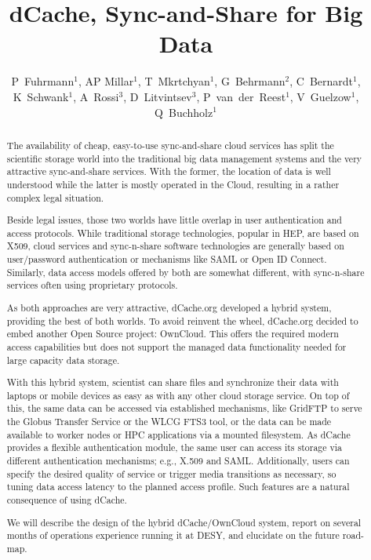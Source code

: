 \documentclass[a4paper]{jpconf}
\begin{document}
\title{dCache, Sync-and-Share for Big Data}

\author{P~Fuhrmann$^1$, AP Millar$^1$, T~Mkrtchyan$^1$,
  G~Behrmann$^2$, C~Bernardt$^1$, K~Schwank$^1$, A~Rossi$^3$,
  D~Litvintsev$^3$, P~van~der~Reest$^1$, V~Guelzow$^1$,
  Q~Buchholz$^1$}

\address{$^1$ IT Dept., DESY, Notkestrasse 85, Hamburg, Germany}
\address{$^2$ NORDUnet, Copenhagen, Denmark}
\address{$^3$ Fermilab, Chicago, IL, USA}


\begin{abstract}
The availability of cheap, easy-to-use sync-and-share cloud services
has split the scientific storage world into the traditional big data
management systems and the very attractive sync-and-share
services. With the former, the location of data is well understood
while the latter is mostly operated in the Cloud, resulting in a
rather complex legal situation.

Beside legal issues, those two worlds have little overlap in user
authentication and access protocols. While traditional storage
technologies, popular in HEP, are based on X509, cloud services and
sync-n-share software technologies are generally based on
user/password authentication or mechanisms like SAML or Open ID
Connect. Similarly, data access models offered by both are somewhat
different, with sync-n-share services often using proprietary
protocols.

As both approaches are very attractive, dCache.org developed a hybrid
system, providing the best of both worlds. To avoid reinvent the
wheel, dCache.org decided to embed another Open Source project:
OwnCloud. This offers the required modern access capabilities but does
not support the managed data functionality needed for large capacity
data storage.

With this hybrid system, scientist can share files and synchronize
their data with laptops or mobile devices as easy as with any other
cloud storage service. On top of this, the same data can be accessed
via established mechanisms, like GridFTP to serve the Globus Transfer
Service or the WLCG FTS3 tool, or the data can be made available to
worker nodes or HPC applications via a mounted filesystem. As dCache
provides a flexible authentication module, the same user can access
its storage via different authentication mechanisms; e.g., X.509 and
SAML. Additionally, users can specify the desired quality of service
or trigger media transitions as necessary, so tuning data access
latency to the planned access profile. Such features are a natural
consequence of using dCache.

We will describe the design of the hybrid dCache/OwnCloud system,
report on several months of operations experience running it at DESY,
and elucidate on the future road-map.
\end{abstract}
\end{document}
